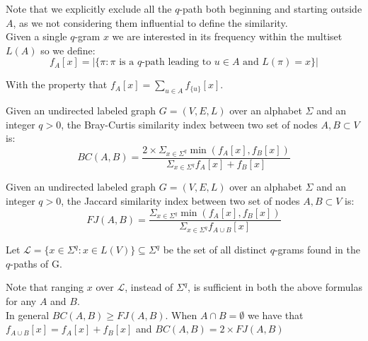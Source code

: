 Note that we explicitly exclude all the $q$-path both beginning and starting outside $A$, as we not considering them influential to define the similarity.\\

Given a single $q$-gram $x$ we are interested in its frequency within the multiset $L(A)$ so we define:
\begin{equation}
	f_{A}[x] = |\{ \pi : \pi \text{ is a $q$-path leading to } u \in A \text{ and } L(\pi) = x \}|
\end{equation}

With the property that $f_{A}[x] = \sum_{u \in A}{f_{\{u\}}[x]}$.

\begin{definizione}
	Given an undirected labeled graph $G = (V,E,L)$ over an alphabet $\Sigma$ and an integer $q > 0$, the Bray-Curtis similarity index between two set of nodes $A, B \subset V$ is:
	\begin{equation}	
		BC(A,B) = \frac{ 2 \times \Sigma_{x \in \Sigma^{q}} \min(f_{A}[x], f_{B}[x]) }{ \Sigma_{x \in \Sigma^{q}} f_{A}[x] + f_{B}[x] }
	\end{equation}
\end{definizione}

\begin{definizione}
	Given an undirected labeled graph $G = (V,E,L)$ over an alphabet $\Sigma$ and an integer $q > 0$, the Jaccard similarity index between two set of nodes $A, B \subset V$ is:
	\begin{equation}	
	FJ(A,B) = \frac{ \Sigma_{x \in \Sigma^{q}} \min(f_{A}[x], f_{B}[x]) }{ \Sigma_{x \in \Sigma^{q}} f_{A \cup B}[x] }
	\end{equation}
\end{definizione}

Let $\mathcal{L} = \{ x \in \Sigma^{q} : x \in L(V) \} \subseteq \Sigma^{q}$ be the set of all distinct $q$-grams found in the $q$-paths of G. 

Note that ranging $x$ over $\mathcal{L}$, instead of $\Sigma^{q}$, is sufficient in both the above formulas for any $A$ and $B$.\\

In general $BC(A,B) \geq FJ(A,B)$. When $A \cap B = \emptyset$ we have that $f_{A \cup B}[x] = f_{A}[x] + f_{B}[x]$ and $BC(A,B) = 2 \times FJ(A,B)$\\



